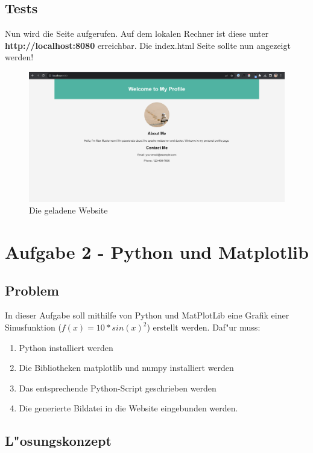 \documentclass[a4paper,11pt,titlepage]{article}
\begin{document}
    \subsection{Tests}
    Nun wird die Seite aufgerufen. Auf dem lokalen Rechner ist diese unter \textbf{http://localhost:8080} erreichbar. Die index.html Seite sollte nun angezeigt werden!
    \begin{figure}
        \centering
        \includegraphics{./images/screen}
        \caption{Die geladene Website}
        \label{fig:}
    \end{figure}


    \section{Aufgabe 2 - Python und Matplotlib}

    \subsection{Problem}
    In dieser Aufgabe soll mithilfe von Python und MatPlotLib eine Grafik einer Sinusfunktion ($f(x) = 10 * sin(x)^2$) erstellt werden.
    Daf"ur muss:
    \begin{enumerate}
        \item Python installiert werden
        \item Die Bibliotheken matplotlib und numpy installiert werden
        \item Das entsprechende Python-Script geschrieben werden
        \item Die generierte Bildatei in die Website eingebunden werden.
    \end{enumerate}

    \subsection{L"osungskonzept}
\end{document}
